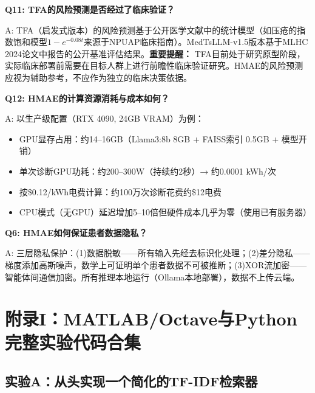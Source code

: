 \documentclass[11pt,a4paper]{ctexart}
\begin{document}
\textbf{Q11: TFA的风险预测是否经过了临床验证？}

A: TFA（启发式版本）的风险预测基于公开医学文献中的统计模型（如压疮的指数饱和模型$1-e^{-0.08t}$来源于NPUAP临床指南）。MedTsLLM-v1.5版本基于MLHC 2024论文中报告的公开基准评估结果。\textbf{重要提醒：} TFA目前处于研究原型阶段，实际临床部署前需要在目标人群上进行前瞻性临床验证研究。HMAE的风险预测应视为辅助参考，不应作为独立的临床决策依据。

\textbf{Q12: HMAE的计算资源消耗与成本如何？}

A: 以生产级配置（RTX 4090, 24GB VRAM）为例：
\begin{itemize}[nosep]
\item GPU显存占用：约14--16GB（Llama3:8b 8GB + FAISS索引 0.5GB + 模型开销）
\item 单次诊断GPU功耗：约200--300W（持续约2秒）→ 约0.0001 kWh/次
\item 按\$0.12/kWh电费计算：约100万次诊断花费约\$12电费
\item CPU模式（无GPU）延迟增加5--10倍但硬件成本几乎为零（使用已有服务器）
\end{itemize}



\textbf{Q6: HMAE如何保证患者数据隐私？}

A: 三层隐私保护：(1)数据脱敏——所有输入先经去标识化处理；(2)差分隐私——梯度添加高斯噪声，数学上可证明单个患者数据不可被推断；(3)XOR流加密——智能体间通信加密。所有推理本地运行（Ollama本地部署），数据不上传云端。


\newpage

\section*{附录I：MATLAB/Octave与Python完整实验代码合集}

\subsection*{实验A：从头实现一个简化的TF-IDF检索器}
\end{document}
